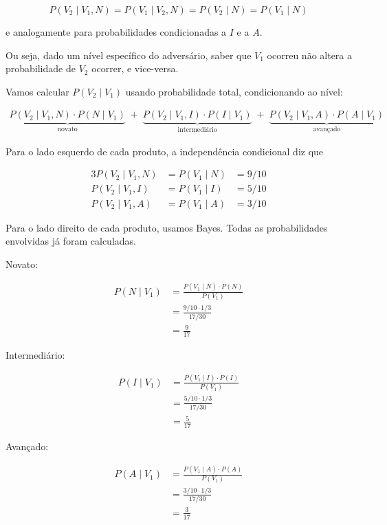 \documentclass[
  11pt]{report}
\begin{document}
\begin{itemize}
  \[
  P(V_2 \mid V_1, N) = P(V_1 \mid V_2, N) = P(V_2 \mid N) = P(V_1 \mid N)
  \]

  e analogamente para probabilidades condicionadas a $I$ e a $A$.

  Ou seja, dado um nível específico do adversário, saber que $V_1$ ocorreu não altera a probabilidade de $V_2$ ocorrer, e vice-versa.

  Vamos calcular $P(V_2 \mid V_1)$ usando probabilidade total, condicionando ao nível:

  \[
  \begin{aligned}
  \underbrace{P(V_2 \mid V_1, N) \cdot P(N \mid V_1)}_{\text{novato}}
  \;+\;
  \underbrace{P(V_2 \mid V_1, I) \cdot P(I \mid V_1)}_{\text{intermediário}}
  \;+\;
  \underbrace{P(V_2 \mid V_1, A) \cdot P(A \mid V_1)}_{\text{avançado}}
  \end{aligned}
  \]

  Para o lado esquerdo de cada produto, a independência condicional diz que

  \begin{alignat*}{3}
  P(V_2 \mid V_1, N) &= P(V_1 \mid N) &= 9/10 \\
  P(V_2 \mid V_1, I) &= P(V_1 \mid I) &= 5/10 \\
  P(V_2 \mid V_1, A) &= P(V_1 \mid A) &= 3/10
  \end{alignat*}

  Para o lado direito de cada produto, usamos Bayes. Todas as probabilidades envolvidas já foram calculadas.

  Novato:

  \[
  \begin{aligned}
  P(N \mid V_1) 
  &=
  \frac{P(V_1 \mid N) \cdot P(N)}{P(V_1)}
  \\
  &= \frac{9/10 \cdot 1/3}{17/30}
  \\
  &= \frac{9}{17}
  \end{aligned}
  \]

  Intermediário:

  \[
  \begin{aligned}
  P(I \mid V_1) 
  &=
  \frac{P(V_1 \mid I) \cdot P(I)}{P(V_1)}
  \\
  &= \frac{5/10 \cdot 1/3}{17/30}
  \\
  &= \frac{5}{17}
  \end{aligned}
  \]

  Avançado:

  \[
  \begin{aligned}
  P(A \mid V_1) 
  &=
  \frac{P(V_1 \mid A) \cdot P(A)}{P(V_1)}
  \\
  &= \frac{3/10 \cdot 1/3}{17/30}
  \\
  &= \frac{3}{17}
  \end{aligned}
  \]


\end{itemize}
\end{document}

